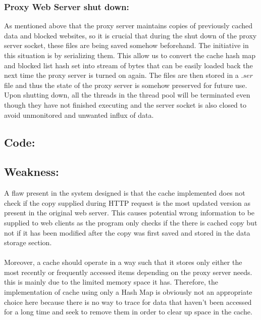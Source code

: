 \documentclass[12pt]{article}%
\begin{document}
\subsubsection*{Proxy Web Server shut down:}
As mentioned above that the proxy server maintains copies of previously cached data and blocked websites, so it is crucial that during the shut down of the proxy server socket, these files are being saved somehow beforehand. The initiative in this situation is by serializing them. This allow us to convert the cache hash map and blocked list hash set into stream of bytes that can be easily loaded back the next time the proxy server is turned on again. The files are then stored in a $.ser$ file and thus the state of the proxy server is somehow preserved for future use. Upon shutting down, all the threads in the thread pool will be terminated even though they have not finished executing and the server socket is also closed to avoid unmonitored and unwanted influx of data. \\
\subsection*{Code:}

\subsection*{Weakness:}
A flaw present in the system designed is that the cache implemented does not check if the copy supplied during HTTP request is the most updated version as present in the original web server. This causes potential wrong information to be supplied to web clients as the program only checks if the there is cached copy but not if it has been modified after the copy was first saved and stored in the data storage section. \\ \\
Moreover, a cache should operate in a way such that it stores only either the most recently or frequently accessed items depending on the proxy server needs. this is mainly due to the limited memory space it has. Therefore, the implementation of cache using only a Hash Map is obviously not an appropriate choice here because there is no way to trace for data that haven't been accessed for a long time and seek to remove them in order to clear up space in the cache. \\
\end{document}
